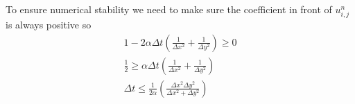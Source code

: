 \documentclass{article}
\begin{document}
To ensure numerical stability we need to make sure the coefficient in front of $u_{i,j}^n$ is always positive so
\begin{equation}
    \begin{aligned}
        1-2\alpha\Delta t\left(\frac{1}{\Delta x^2}+\frac{1}{\Delta y^2}\right)\geqslant 0\\
        \frac{1}{2}\geqslant\alpha\Delta t\left(\frac{1}{\Delta x^2}+\frac{1}{\Delta y^2}\right)\\
        \Delta t\leqslant\frac{1}{2\alpha}\left(\frac{\Delta x^2\Delta y^2}{\Delta x^2+\Delta y^2}\right)
    \end{aligned}
\end{equation}
\end{document}
